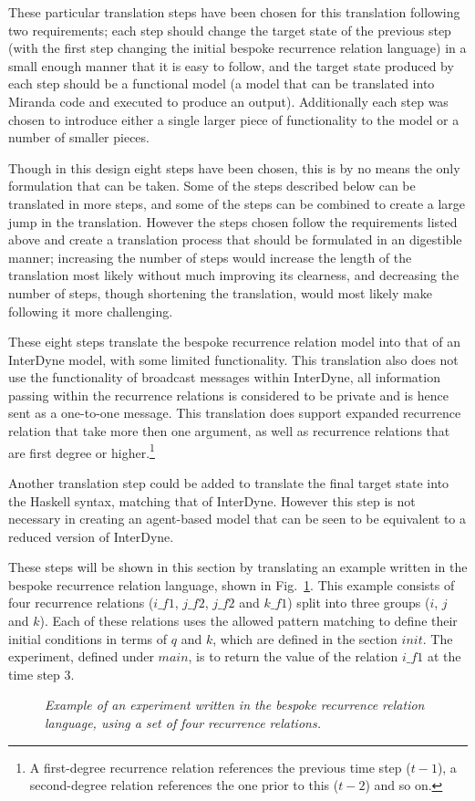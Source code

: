 \documentclass{article}
\begin{document}
These particular translation steps have been chosen for this translation following two requirements; each step should change the target state of the previous step (with the first step changing the initial bespoke recurrence relation language) in a small enough manner that it is easy to follow, and the target state produced by each step should be a functional model (a model that can be translated into Miranda code and executed to produce an output). Additionally each step was chosen to introduce either a single larger piece of functionality to the model or a number of smaller pieces. 

Though in this design eight steps have been chosen, this is by no means the only formulation that can be taken. Some of the steps described below can be translated in more steps, and some of the steps can be combined to create a large jump in the translation. However the steps chosen follow the requirements listed above and create a translation process that should be formulated in an digestible manner; increasing the number of steps would increase the length of the translation most likely without much improving its clearness, and decreasing the number of steps, though shortening the translation, would most likely make following it more challenging.    

These eight steps translate the bespoke recurrence relation model into that of an InterDyne model, with some limited functionality. This translation also does not use the functionality of broadcast messages within InterDyne, all information passing within the recurrence relations is considered to be private and is hence sent as a one-to-one message. This translation does support expanded recurrence relation that take more then one argument, as well as recurrence relations that are first degree or higher.\footnote{A first-degree recurrence relation references the previous time step ($t-1$), a second-degree relation references the one prior to this ($t-2$) and so on.}  

Another translation step could be added to translate the final target state into the Haskell syntax, matching that of InterDyne. However this step is not necessary in creating an agent-based model that can be seen to be equivalent to a reduced version of InterDyne.  

These steps will be shown in this section by translating an example written in the bespoke recurrence relation language, shown in Fig.~\ref{fig:rre1}. This example consists of four recurrence relations ($i\_f1$, $j\_f2$, $j\_f2$ and $k\_f1$) split into three groups ($i$, $j$ and $k$). Each of these relations uses the allowed pattern matching to define their initial conditions in terms of $q$ and $k$, which are defined in the section $init$. The experiment, defined under $main$, is to return the value of the relation $i\_f1$ at the time step 3.  
\begin{figure}[H]
	\centering
	
	\caption{\it Example of an experiment written in the bespoke recurrence relation language, using a set of four recurrence relations.}
	\label{fig:rre1}
\end{figure} 
\end{document}
